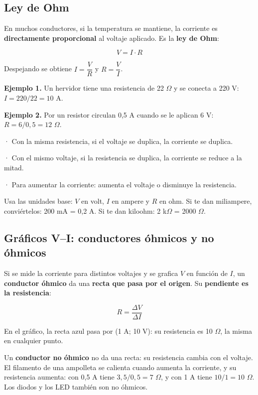 \subsection{Ley de Ohm}
En muchos conductores, si la temperatura se mantiene, la corriente es \textbf{directamente proporcional} al voltaje aplicado. Es la \textbf{ley de Ohm}:

 \[ V = I\cdot R \] 

Despejando se obtiene $I = \dfrac{V}{R}$ y $R = \dfrac{V}{I}$.

 

\textbf{Ejemplo 1.} Un hervidor tiene una resistencia de 22 \ensuremath{\Omega} y se conecta a 220 V: $I = 220/22 = 10$ A.

 

\textbf{Ejemplo 2.} Por un resistor circulan 0,5 A cuando se le aplican 6 V: $R = 6/0{,}5 = 12$ \ensuremath{\Omega}.

  
\begin{clave} · Con la misma resistencia, si el voltaje se duplica, la corriente se duplica.\par · Con el mismo voltaje, si la resistencia se duplica, la corriente se reduce a la mitad.\par · Para aumentar la corriente: aumenta el voltaje o disminuye la resistencia.\end{clave}
 
\begin{clave}[{Recuerda}] Usa las unidades base: $V$ en volt, $I$ en ampere y $R$ en ohm. Si te dan miliampere, conviértelos: 200 mA = 0,2 A. Si te dan kiloohm: 2 k\ensuremath{\Omega} = 2000 \ensuremath{\Omega}.\end{clave}
\subsection{Gráficos V--I: conductores óhmicos y no óhmicos}
Si se mide la corriente para distintos voltajes y se grafica $V$ en función de $I$, un \textbf{conductor óhmico} da una \textbf{recta que pasa por el origen}. Su \textbf{pendiente es la resistencia}:

 \[ R = \dfrac{\Delta V}{\Delta I} \] 

En el gráfico, la recta azul pasa por (1 A; 10 V): su resistencia es 10 \ensuremath{\Omega}, la misma en cualquier punto.

 

Un \textbf{conductor no óhmico} no da una recta: su resistencia cambia con el voltaje. El filamento de una ampolleta se calienta cuando aumenta la corriente, y su resistencia aumenta: con 0,5 A tiene $3{,}5/0{,}5 = 7$ \ensuremath{\Omega}, y con 1 A tiene $10/1 = 10$ \ensuremath{\Omega}. Los diodos y los LED también son no óhmicos.

